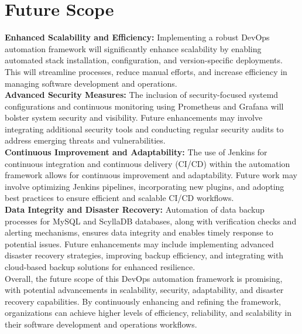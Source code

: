 \documentclass[12pt,a4paper,oneside]{report}
\begin{document}
\chapter{Future Scope}
\textbf{Enhanced Scalability and Efficiency: }Implementing a robust DevOps automation framework will significantly enhance scalability by enabling automated stack installation, configuration, and version-specific deployments. This will streamline processes, reduce manual efforts, and increase efficiency in managing software development and operations. \\
\textbf{Advanced Security Measures: } The inclusion of security-focused systemd configurations and continuous monitoring using Prometheus and Grafana will bolster system security and visibility. Future enhancements may involve integrating additional security tools and conducting regular security audits to address emerging threats and vulnerabilities. \\
\textbf{Continuous Improvement and Adaptability: }The use of Jenkins for continuous integration and continuous delivery (CI/CD) within the automation framework allows for continuous improvement and adaptability. Future work may involve optimizing Jenkins pipelines, incorporating new plugins, and adopting best practices to ensure efficient and scalable CI/CD workflows. \\
\textbf{Data Integrity and Disaster Recovery: }Automation of data backup processes for MySQL and ScyllaDB databases, along with verification checks and alerting mechanisms, ensures data integrity and enables timely response to potential issues. Future enhancements may include implementing advanced disaster recovery strategies, improving backup efficiency, and integrating with cloud-based backup solutions for enhanced resilience.\\
Overall, the future scope of this DevOps automation framework is promising, with potential advancements in scalability, security, adaptability, and disaster recovery capabilities. By continuously enhancing and refining the framework, organizations can achieve higher levels of efficiency, reliability, and scalability in their software development and operations workflows.



\newpage
\end{document}
